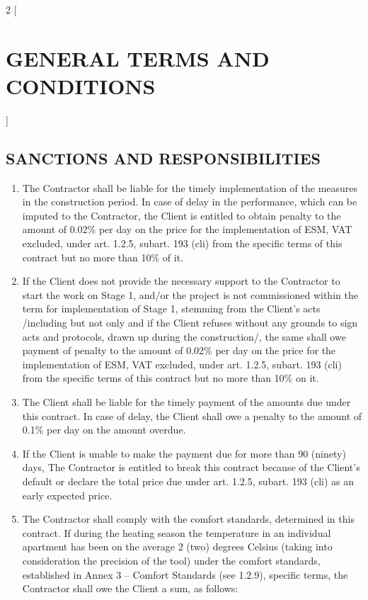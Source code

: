 \begin{multicols}{2} [\section{GENERAL TERMS AND CONDITIONS}]
    \subsection{SANCTIONS AND RESPONSIBILITIES}
    \begin{enumerate}
    \item The Contractor shall be liable for the timely implementation
      of the measures in the construction period. In case of delay in
      the performance, which can be imputed to the Contractor, the
      Client is entitled to obtain penalty to the amount of 0.02\% per
      day on the price for the implementation of ESM, VAT excluded,
      under art. 1.2.5, subart. 193 (cli) from the specific terms of
      this contract but no more than 10\% of it.
    \item If the Client does not provide the necessary support to the
      Contractor to start the work on Stage 1, and/or the project is
      not commissioned within the term for implementation of Stage 1,
      stemming from the Client’s acts /including but not only and if
      the Client refuses without any grounds to sign acts and
      protocols, drawn up during the construction/, the same shall owe
      payment of penalty to the amount of 0.02\% per day on the price
      for the implementation of ESM, VAT excluded, under art. 1.2.5,
      subart. 193 (cli) from the specific terms of this contract but
      no more than 10\% on it.
    \item The Client shall be liable for the timely payment of the
      amounts due under this contract. In case of delay, the Client
      shall owe a penalty to the amount of 0.1\% per day on the amount
      overdue.
    \item If the Client is unable to make the payment due for more
      than 90 (ninety) days, The Contractor is entitled to break this
      contract because of the Client’s default or declare the total
      price due under art. 1.2.5, subart. 193 (cli) as an early
      expected price.
    \item The Contractor shall comply with the comfort standards,
      determined in this contract. If during the heating season the
      temperature in an individual apartment has been on the average 2
      (two) degrees Celsius (taking into consideration the precision
      of the tool) under the comfort standards, established in Annex 3
      – Comfort Standards (see 1.2.9), specific terms, the Contractor
      shall owe the Client a sum, as follows:
      \begin{enumerate}

\end{enumerate}
\end{enumerate}
\end{multicols}
